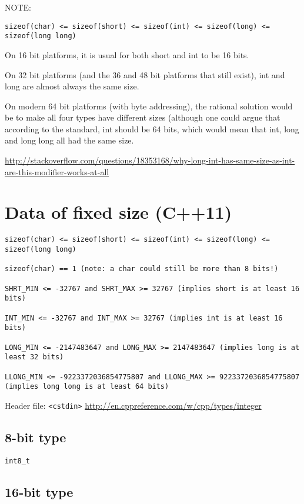 NOTE:
\begin{verbatim}
sizeof(char) <= sizeof(short) <= sizeof(int) <= sizeof(long) <= sizeof(long long)
\end{verbatim}

On 16 bit platforms, it is usual for both short and int to be 16 bits.

On 32 bit platforms (and the 36 and 48 bit platforms that still exist), int and
long are almost always the same size. 

On modern 64 bit platforms (with byte addressing), the rational solution would
be to make all four types have different sizes (although one could argue that
according to the standard, int should be 64 bits, which would mean that int,
long and long long all had the same size.

\url{http://stackoverflow.com/questions/18353168/why-long-int-has-same-size-as-int-are-this-modifier-works-at-all}

\section{Data of fixed size (C++11)}

\begin{verbatim}
sizeof(char) <= sizeof(short) <= sizeof(int) <= sizeof(long) <= sizeof(long long)

sizeof(char) == 1 (note: a char could still be more than 8 bits!)

SHRT_MIN <= -32767 and SHRT_MAX >= 32767 (implies short is at least 16 bits)

INT_MIN <= -32767 and INT_MAX >= 32767 (implies int is at least 16 bits)

LONG_MIN <= -2147483647 and LONG_MAX >= 2147483647 (implies long is at least 32 bits)

LLONG_MIN <= -9223372036854775807 and LLONG_MAX >= 9223372036854775807 (implies long long is at least 64 bits)
\end{verbatim}

Header file: \verb!<cstdin>! 
\url{http://en.cppreference.com/w/cpp/types/integer}

\subsection{8-bit type}

\begin{verbatim}
int8_t
\end{verbatim}


\subsection{16-bit type}

